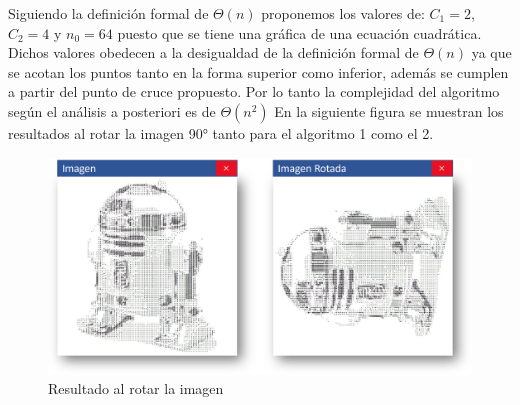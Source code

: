 \documentclass[12pt,twoside]{article}
\begin{document}
        Siguiendo la definición formal de $\Theta(n)$ proponemos los valores de: $C_{1}=2$, $C_{2}=4$ y $n_{0}=64$ puesto que se tiene una gráfica de una ecuación cuadrática. Dichos valores obedecen a la desigualdad de la definición formal de $\Theta(n)$ ya que se acotan los puntos tanto en la forma superior como inferior, además se cumplen a partir del punto de cruce propuesto. Por lo tanto la complejidad del algoritmo según el análisis a posteriori es de $\Theta(n^2)$
        En la siguiente figura se muestran los resultados al rotar la imagen 90° tanto para el algoritmo 1 como el 2.
        \\
        \begin{figure}[h]
        \centering
        \includegraphics[width=14cm]{imagenes/r1.png}
        \caption{Resultado al rotar la imagen}
        \end{figure}
        
    \newpage
\end{document}
